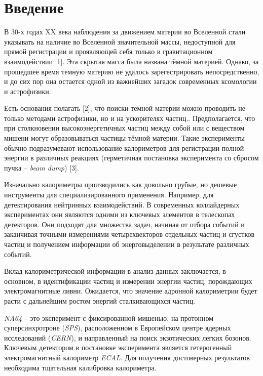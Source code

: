 \newpage
\section*{Введение}  \label{sec:intro}

В 30-х годах XX века наблюдения за движением материи во Вселенной стали указывать на наличие во Вселенной значительной массы, недоступной для прямой регистрации и проявляющей себя только в гравитационном взаимодействии [1]. Эта скрытая масса была названа тёмной материей. Однако, за прошедшее время темную материю не удалось зарегестрировать непосредственно, и до сих пор она остается одной из важнейших загадок современных ксомологии и астрофизики.

Есть основания полагать [2], что поиски темной материи можно проводить не только методами астрофизики, но и на ускорителях частиц..  Предполагается, что при столкновении высокоэнергетичных частиц между собой или с веществом мишени могут образовываться частицы тёмной материи. Такие эксперименты обычно подразумевают использование калориметров для регистрации полной энергии в различных реакциях (герметичная постановка эксперимента со сбросом пучка -- \textit{beam dump}) [3].

Изначально калориметры производились как довольно грубые, но дешевые инструменты для специализированного применения. Например, для детектирования нейтринных взаимодействий. В современных коллайдерных экспериментах они являются одними из ключевых элементов в телескопах детекторов. Они подходят для множества задач, начиная от отбора событий и заканчивая точными измерениями четырехвекторов отдельных частиц и сгустков частиц и получением информации об энерговыделении в результате различных событий.
	
Вклад калориметрической информации в анализ данных заключается, в основном, в идентификации частиц и измерении энергии частиц, порождающих электромагнитные ливни. Ожидается, что значение адронной калориметрии будет расти с дальнейшим ростом энергий сталкивающихся частиц.
            
\textit{NA64} – это эксперимент с фиксированной мишенью, на протонном суперсинхротроне (\textit{SPS}), расположенном в Европейском центре ядерных исследований (\textit{CERN}), и направленный на поиск экзотических легких бозонов. Ключевым детектором в постановке эксперимента является гетерогенный электромагнитный калориметр \textit{ECAL}. Для получения достоверных результатов необходима тщательная калибровка калориметра. 

